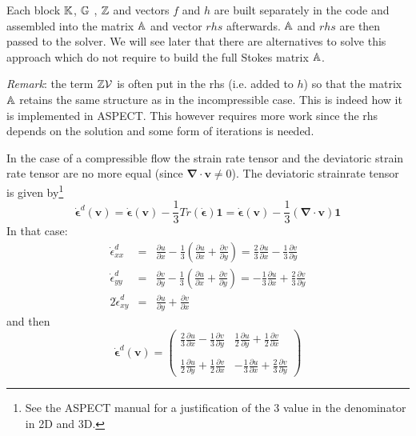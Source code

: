 Each block ${\mathbb{K}}$, ${\mathbb{G}}$ , ${\mathbb{Z}}$ and vectors $f$ and $h$ are built separately 
in the code and assembled into 
the matrix ${\mathbb{A}}$ and vector $rhs$ afterwards. ${\mathbb{A}}$ and $rhs$ are then passed to the solver. 
We will see later that there are alternatives to solve this approach which do not require to 
build the full Stokes matrix ${\mathbb{A}}$. 

{\sl Remark}: the term ${\mathbb{Z}} {\cal V}$ is often put in the rhs (i.e. added to $h$) so that 
the matrix ${\mathbb{A}}$ retains the same structure as in the incompressible case. This is indeed 
how it is implemented in ASPECT. This however requires more work since the rhs depends 
on the solution and some form of iterations is needed. 

In the case of a compressible flow the strain rate tensor and the deviatoric strain rate tensor are no more equal (since ${\bm \nabla}\cdot{\bm v} \neq 0$).
The deviatoric strainrate tensor is given by\footnote{See the ASPECT manual for a justification of the 3 value in the denominator in 2D and 3D.} 
\[
\dot{\bm \epsilon}^d({\bm v})=
\dot{\bm \epsilon}({\bm v})-\frac{1}{3} Tr(\dot{\bm \epsilon}) {\bm 1}
=\dot{\bm \epsilon}({\bm v})-\frac{1}{3} ({\bm \nabla}\cdot{\bm v}) {\bm 1}
\]
In that case:
\begin{eqnarray}
\dot{\epsilon}_{xx}^d 
&=& \frac{\partial u}{\partial x}
-\frac{1}{3} \left( \frac{\partial u}{\partial x} + \frac{\partial v}{\partial y} \right) 
= \frac{2}{3}\frac{\partial u}{\partial x}
-\frac{1}{3} \frac{\partial v}{\partial y}
\\
\dot{\epsilon}_{yy}^d 
&=& \frac{\partial v}{\partial y}
-\frac{1}{3} \left( \frac{\partial u}{\partial x} + \frac{\partial v}{\partial y} \right) 
=-\frac{1}{3} \frac{\partial u}{\partial x} 
+ \frac{2}{3} \frac{\partial v}{\partial y} 
\\
2\dot{\epsilon}_{xy}^d 
&=& 
\frac{\partial u}{\partial y} 
+\frac{\partial v}{\partial x} 
\end{eqnarray}
and then 
\[
\dot{\bm \epsilon}^d({\bm v})
=
\left(
\begin{array}{cc}
\frac{2}{3} \frac{\partial u}{\partial x} -\frac{1}{3} \frac{\partial v}{\partial y} &
\frac{1}{2}\frac{\partial u}{\partial y} + \frac{1}{2}\frac{\partial v}{\partial x}  \\ \\
\frac{1}{2}\frac{\partial u}{\partial y} + \frac{1}{2}\frac{\partial v}{\partial x}  &
-\frac{1}{3} \frac{\partial u}{\partial x} +\frac{2}{3} \frac{\partial v}{\partial y} 
\end{array}
\right)
\]

